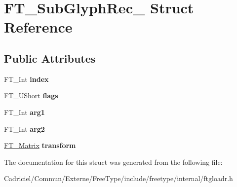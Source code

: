 \hypertarget{struct_f_t___sub_glyph_rec__}{}\section{F\+T\+\_\+\+Sub\+Glyph\+Rec\+\_\+ Struct Reference}
\label{struct_f_t___sub_glyph_rec__}
\subsection*{Public Attributes}
\begin{DoxyCompactItemize}
\item 
F\+T\+\_\+\+Int {\bfseries index}\hypertarget{struct_f_t___sub_glyph_rec___aa4febc2d867ff074ac116b068f372d3a}{}\label{struct_f_t___sub_glyph_rec___aa4febc2d867ff074ac116b068f372d3a}

\item 
F\+T\+\_\+\+U\+Short {\bfseries flags}\hypertarget{struct_f_t___sub_glyph_rec___a2d02aefc16061f7e039f76074518f6e5}{}\label{struct_f_t___sub_glyph_rec___a2d02aefc16061f7e039f76074518f6e5}

\item 
F\+T\+\_\+\+Int {\bfseries arg1}\hypertarget{struct_f_t___sub_glyph_rec___ad9f6b04ef50e1b39db90331e76f38206}{}\label{struct_f_t___sub_glyph_rec___ad9f6b04ef50e1b39db90331e76f38206}

\item 
F\+T\+\_\+\+Int {\bfseries arg2}\hypertarget{struct_f_t___sub_glyph_rec___a0d27a8b473379cedeb061f9ecd7e97da}{}\label{struct_f_t___sub_glyph_rec___a0d27a8b473379cedeb061f9ecd7e97da}

\item 
\hyperlink{struct_f_t___matrix__}{F\+T\+\_\+\+Matrix} {\bfseries transform}\hypertarget{struct_f_t___sub_glyph_rec___a3c5fc1959a357c6c2b970ec2118d2683}{}\label{struct_f_t___sub_glyph_rec___a3c5fc1959a357c6c2b970ec2118d2683}

\end{DoxyCompactItemize}


The documentation for this struct was generated from the following file\+:\begin{DoxyCompactItemize}
\item 
Cadriciel/\+Commun/\+Externe/\+Free\+Type/include/freetype/internal/ftgloadr.\+h\end{DoxyCompactItemize}
